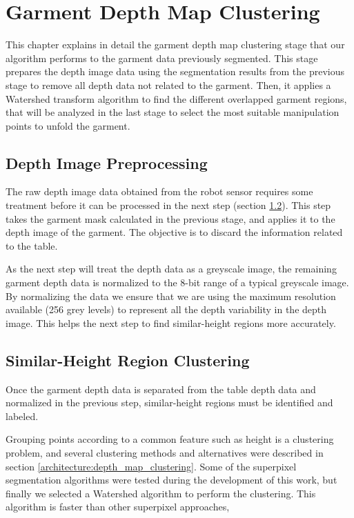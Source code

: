 \chapter{Garment Depth Map Clustering}
\label{garment_clustering}

This chapter explains in detail the garment depth map clustering stage that our algorithm performs to the garment data previously segmented. This stage prepares the depth image data using the segmentation results from the previous stage to remove all depth data not related to the garment. Then, it applies a Watershed transform algorithm to find the different overlapped garment regions, that will be analyzed in the last stage to select the most suitable manipulation points to unfold the garment.

\section{Depth Image Preprocessing}
\label{depth_image_preprocessing}

The raw depth image data obtained from the robot sensor requires some treatment before it can be processed in the next step (section \ref{garment_clustering_watershed}). This step takes the garment mask calculated in the previous stage, and applies it to the depth image of the garment. The objective is to discard the information related to the table. 

As the next step will treat the depth data as a greyscale image, the remaining garment depth data is normalized to the 8-bit range of a typical greyscale image. By normalizing the data we ensure that we are using the maximum resolution available (256 grey levels) to represent all the depth variability in the depth image. This helps the next step to find similar-height regions more accurately.


\section{Similar-Height Region Clustering}
\label{garment_clustering_watershed}

Once the garment depth data is separated from the table depth data and normalized in the previous step, similar-height regions must be identified and labeled.

Grouping points according to a common feature such as height is a clustering problem, and several clustering methods and alternatives were described in section \ref{architecture:depth_map_clustering}. Some of the superpixel segmentation algorithms were tested during the development of this work, but finally we selected a Watershed algorithm to perform the clustering. This algorithm is faster than other superpixel approaches, \comment{[...]}

